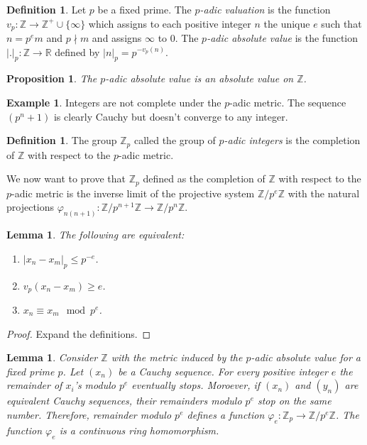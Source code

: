 \documentclass[12pt]{article}
\newtheorem{prop}[thm]{Proposition}
\newtheorem{lem}[thm]{Lemma}
\theoremstyle{definition}
\newtheorem{dfn}[thm]{Definition}
\newtheorem{exm}[thm]{Example}
\theoremstyle{remark}
\begin{document}
    \begin{dfn}
        Let $p$ be a fixed prime. The \emph{$p$-adic valuation} is the function $v_p\colon\mathbb{Z}\to\mathbb{Z^+}\cup\{\infty\}$ which assigns to each positive integer $n$ the unique $e$ such that $n=p^em$ and $p\nmid m$ and assigns $\infty$ to 0. The \emph{$p$-adic absolute value} is the function $|.|_p\colon\mathbb{Z}\to \mathbb{R}$ defined by $|n|_p=p^{-v_p(n)}$.
    \end{dfn}

    \begin{prop}
        The $p$-adic absolute value is an absolute value on $\mathbb{Z}$.
    \end{prop}

    \begin{exm}
        Integers are not complete under the $p$-adic metric. The sequence $(p^n+1)$ is clearly Cauchy but doesn't converge to any integer. 
    \end{exm}

    \begin{dfn}
        The group $\mathbb{Z}_p$ called the group of \emph{$p$-adic integers} is the completion of $\mathbb{Z}$ with respect to the $p$-adic metric.
    \end{dfn}

    We now want to prove that $\mathbb{Z}_p$ defined as the completion of $\mathbb{Z}$ with respect to the $p$-adic metric is the inverse limit of the projective system $\mathbb{Z}/p^e\mathbb{Z}$ with the natural projections $\varphi_{n(n+1)}\colon \mathbb{Z}/p^{n+1}\mathbb{Z}\to \mathbb{Z}/p^{n}\mathbb{Z}$.

    \begin{lem}
        The following are equivalent:
        \begin{enumerate}[label=(\alph*)]
            \item $|x_n-x_m|_p\leq p^{-e}$.
            \item $v_p(x_n-x_m)\geq e$.
            \item $x_n\equiv x_m \mod p^e$.
        \end{enumerate}
    \end{lem}

    \begin{proof}
        Expand the definitions.
    \end{proof}

    \begin{lem}
        Consider $\mathbb{Z}$ with the metric induced by the $p$-adic absolute value for a fixed prime $p$. Let $(x_n)$ be a Cauchy sequence. For every positive integer $e$ the remainder of $x_i$'s modulo $p^e$ eventually stops. Moroever, if $(x_n)$ and $(y_n)$ are equivalent Cauchy sequences, their remainders modulo $p^e$ stop on the same number. Therefore, remainder modulo $p^e$ defines a function $\varphi_e\colon \mathbb{Z}_p\to \mathbb{Z}/p^e\mathbb{Z}$. The function $\varphi_e$ is a continuous ring homomorphism.
    \end{lem}
\end{document}
